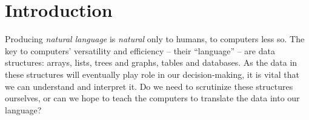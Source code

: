 \documentclass[12pt,notitlepage,a4paper,openright]{report}
\begin{document}
\cleardoublepage{}
\tableofcontents %

\cleardoublepage{}
\renewcommand{\chapterheadstartvskip}{\vspace*{-10mm}} %

%
%
\renewcommand{\thepage}{\arabic{page}}
\setcounter{page}{1}




\sloppy
% 
% 
% 

\chapter{Introduction}
\label{chap:intro}
Producing \textit{natural language} is \textit{natural} only to humans, to computers less so. The key to computers' versatility and efficiency -- their ``language'' -- are data structures: arrays, lists, trees and graphs, tables and databases. As the data in these structures will eventually play role in our decision-making, it is vital that we can understand and interpret it. Do we need to scrutinize these structures ourselves, or can we hope to teach the computers to translate the data into our language?
\end{document}
